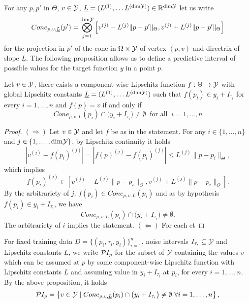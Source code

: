 For any $p,p'$ in $\Theta$, $v\in \mathcal Y$, $\underline{L} = (L^{(1)},\dots L^{(\text{dim}\mathcal Y)} ) \in \mathbb{R}^{\text{dim} \mathcal Y}$ let us write 
\[
        Cone_{p,v,\underline L}(p') = \bigotimes_{j=1}^{\text{dim} \mathcal Y} \left[ v^{(j)} - L^{(j)} \|p-p'\|_\Theta, v^{(j)} + L^{(j)} \|p-p'\|_\Theta \right]
\]
for the projection in $p'$ of the cone in $\Omega \times \mathcal Y$ of vertex $(p,v)$ and directrix of slope $\underline L$.
The following proposition allows us to define a predictive interval of possible values for the target function $y$ in a point $p$.
\begin{prp}
    Let $v \in \mathcal Y$, there exists a component-wise Lipschitz function $f: \Theta \rightarrow \mathcal Y$ with global Lipschitz constants $\underline L = (L^{(1)},\dots L^{(\text{dim}\mathcal Y)} )$ such that $f(p_i) \in y_i + I_{\tau_i}$ for every $i = 1, \dots, n$ and $f(p) = v$ if and only if 
        \[
        Cone_{p,v,\underline L}(p_i) \cap  \big ( y_i + I_{\tau_i} \big ) \neq \emptyset \ \text{ for all } \ i = 1, \dots, n
        \]
\end{prp}
\begin{proof}
    $(\Rightarrow)$ Let $v\in \mathcal Y$ and let $f$ be as in the statement.
    For any $i\in \{1, \dots, n\}$ and $j \in \{1, \dots, \text{dim}\mathcal Y\}$, by Lipschitz continuity it holds 
    \[
    | v^{(j)} - f(p_i)^{(j)} | = | f(p)^{(j)} - f(p_i)^{(j)} | \leq L^{(j)} \|p-p_i\|_\Theta, 
    \] 
    which implies \[
        f(p_i)^{(j)} \in \left[ v^{(j)} - L^{(j)} \|p-p_i\|_\Theta, v^{(j)} + L^{(j)} \|p-p_i\|_\Theta \right].
    \]
    By the arbitrariety of $j$, $f(p_i) \in Cone_{p,v,\underline L}(p_i) $ and as by hypothesis $f(p_i) \in y_i + I_{\tau_i}$, we have \[
    Cone_{p,v,\underline L}(p_i) \cap  \big ( y_i + I_{\tau_i} \big ) \neq \emptyset.
    \] 
    The arbitrariety of $i$ implies the statement. \newline
    $(\Leftarrow)$ For each et  
\end{proof}
For fixed training data $D =\{(p_i, \tau_i, y_i)\}_{i=1}^n $, noise intervals $I_{\tau_i} \subseteq \mathcal Y$ and Lipschitz constants $\underline L$, we write $\mathcal P I_p$ for the subset of $\mathcal Y$ containing the values $v$ which can be assumed at $p$ by some component-wise Lipschitz function with Lipschitz constants $\underline L$ and assuming value in $y_i + I_{\tau_i}$ at $p_i$, for every $i=1, \dots, n$.  \newline
By the above proposition, it holds
\begin{equation}\label{eq:LR-PI-general}
    \mathcal PI_p = \left \{ v \in \mathcal Y \mid Cone_{p,v,\underline L}(p_i) \cap  \big ( y_i + I_{\tau_i} \big ) \neq \emptyset \ \forall i = 1, \dots, n \right \},
\end{equation}
